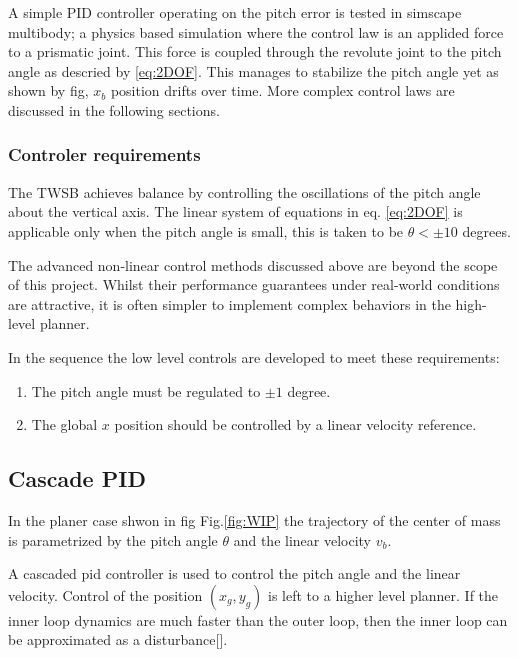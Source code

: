         A simple PID controller operating on the pitch error is tested in simscape multibody; 
        a physics based simulation where the control law is an applided force to a prismatic joint. 
        This force is coupled through the revolute joint to the pitch angle as descried by \ref{eq:2DOF}.
        This manages to stabilize the pitch angle yet as shown by fig, $x_b$ position drifts over time.
        More complex control laws are discussed in the following sections.

        \subsubsection{Controler requirements}

        The TWSB achieves balance by controlling the oscillations of the pitch angle about the 
        vertical axis. The linear system of equations in eq. \ref{eq:2DOF} is applicable 
        only when the pitch angle is small, this is taken to be $\theta < ±10$ degrees. 

        The advanced non-linear control methods discussed above are beyond the scope of this project. 
        Whilst their performance guarantees under real-world conditions are attractive, it is often simpler 
        to implement complex behaviors in the high-level planner.

        In the sequence the low level controls are developed to meet these requirements:
        \begin{enumerate}
            \item The pitch angle must be regulated to $±1$ degree.
            \item The global $x$ position should be controlled by a linear velocity reference.
        \end{enumerate}

        \subsection{Cascade PID}
        
        In the planer case shwon in fig Fig.\ref{fig:WIP} the trajectory of the center of mass is parametrized by 
        the pitch angle $\theta$ and the linear velocity $v_b$. 
    

        A cascaded pid controller is used to control the pitch angle and the linear velocity. 
        Control of the position $(x_g,y_g)$ is left to a higher level planner.  
        If the inner loop dynamics are much faster than the outer loop, 
        then the inner loop can be approximated as a disturbance[].

